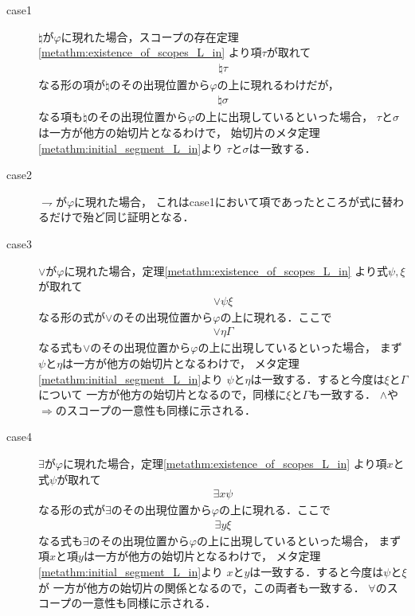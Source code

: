 	\begin{metaprf}\mbox{}
		\begin{description}
			\item[case1]
				$\natural$が$\varphi$に現れた場合，スコープの存在定理\ref{metathm:existence_of_scopes_L_in}
				より項$\tau$が取れて
				\begin{align}
					\natural \tau
				\end{align}
				なる形の項が$\natural$のその出現位置から$\varphi$の上に現れるわけだが，
				\begin{align}
					\natural \sigma
				\end{align}
				なる項も$\natural$のその出現位置から$\varphi$の上に出現しているといった場合，
				$\tau$と$\sigma$は一方が他方の始切片となるわけで，
				始切片のメタ定理\ref{metathm:initial_segment_L_in}より
				$\tau$と$\sigma$は一致する．
			
			\item[case2]
				$\rightharpoondown$が$\varphi$に現れた場合，
				これはcase1において項であったところが式に替わるだけで殆ど同じ証明となる．
			
			\item[case3]
				$\vee$が$\varphi$に現れた場合，定理\ref{metathm:existence_of_scopes_L_in}
				より式$\psi,\xi$が取れて
				\begin{align}
					\vee \psi \xi
				\end{align}
				なる形の式が$\vee$のその出現位置から$\varphi$の上に現れる．ここで
				\begin{align}
					\vee \eta \Gamma
				\end{align}
				なる式も$\vee$のその出現位置から$\varphi$の上に出現しているといった場合，
				まず$\psi$と$\eta$は一方が他方の始切片となるわけで，
				メタ定理\ref{metathm:initial_segment_L_in}より
				$\psi$と$\eta$は一致する．すると今度は$\xi$と$\Gamma$について
				一方が他方の始切片となるので，同様に$\xi$と$\Gamma$も一致する．
				$\wedge$や$\Longrightarrow$のスコープの一意性も同様に示される．
				
			\item[case4]
				$\exists$が$\varphi$に現れた場合，定理\ref{metathm:existence_of_scopes_L_in}
				より項$x$と式$\psi$が取れて
				\begin{align}
					\exists x \psi
				\end{align}
				なる形の式が$\exists$のその出現位置から$\varphi$の上に現れる．ここで
				\begin{align}
					\exists y \xi
				\end{align}
				なる式も$\exists$のその出現位置から$\varphi$の上に出現しているといった場合，
				まず項$x$と項$y$は一方が他方の始切片となるわけで，
				メタ定理\ref{metathm:initial_segment_L_in}より
				$x$と$y$は一致する．すると今度は$\psi$と$\xi$が
				一方が他方の始切片の関係となるので，この両者も一致する．
				$\forall$のスコープの一意性も同様に示される．
				\QED
		\end{description}
	\end{metaprf}
	
